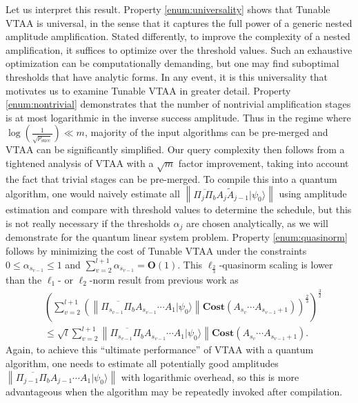 \documentclass[letterpaper,onecolumn,11pt,accepted=2026-02-14]{quantumarticle}
\newcommand{\norm}[1]{\left\lVert#1\right\rVert}
\theoremstyle{remark}
\theoremstyle{plain}
\newcommand{\ket}[1]{|#1\rangle}
\begin{document}
Let us interpret this result. Property \ref{enum:universality} shows that Tunable VTAA is universal, in the sense that it captures the full power of a generic nested amplitude amplification. Stated differently, to improve the complexity of a nested amplification, it suffices to optimize over the threshold values. Such an exhaustive optimization can be computationally demanding, but one may find suboptimal thresholds that have analytic forms. In any event, it is this universality that motivates us to examine Tunable VTAA in greater detail. 
Property \ref{enum:nontrivial} demonstrates that the number of nontrivial amplification stages is at most logarithmic in the inverse success amplitude. Thus in the regime where $\log\left(\frac{1}{\sqrt{p_{\text{succ}}}}\right)\ll m$, majority of the input algorithms can be pre-merged and VTAA can be significantly simplified. 
Our query complexity then follows from a tightened analysis of VTAA with a $\sqrt{m}$ factor improvement, taking into account the fact that trivial stages can be pre-merged. To compile this into a quantum algorithm, one would naively estimate all $\norm{\overline{\Pi_j\Pi_b}A_j\widetilde A_{j-1}\ket{\psi_0}}$ using amplitude estimation and compare with threshold values to determine the schedule, but this is not really necessary if the thresholds $\alpha_j$ are chosen analytically, as we will demonstrate for the quantum linear system problem. Property \ref{enum:quasinorm} follows by minimizing the cost of Tunable VTAA under the constraints $0\leq\alpha_{s_{v-1}}\leq1$ and $\sum_{v=2}^{l+1}\alpha_{s_{v-1}}=\mathbf{O}(1)$. This $\ell_{\frac{2}{3}}$-quasinorm scaling is lower than the $\ell_1$- or $\ell_2$-norm result from previous work as
\begin{equation}
\begin{aligned}
    &\left(\sum_{v=2}^{l+1}\left(\norm{\overline{\Pi_{s_{v-1}}\Pi_b}A_{s_{v-1}}\cdots A_1\ket{\psi_0}}\mathbf{Cost}\left(A_{s_v}\cdots A_{s_{v-1}+1}\right)\right)^{\frac{2}{3}}\right)^{\frac{3}{2}}\\
    &\leq\sqrt{l}\sum_{v=2}^{l+1}\norm{\overline{\Pi_{s_{v-1}}\Pi_b}A_{s_{v-1}}\cdots A_1\ket{\psi_0}}\mathbf{Cost}\left(A_{s_v}\cdots A_{s_{v-1}+1}\right).
\end{aligned}
\end{equation}
Again, to achieve this ``ultimate performance'' of VTAA with a quantum algorithm, one needs to estimate all potentially good amplitudes $\norm{\overline{\Pi_{j-1}\Pi_b}A_{j-1}\cdots A_1\ket{\psi_0}}$ with logarithmic overhead, so this is more advantageous when the algorithm may be repeatedly invoked after compilation.
\end{document}
